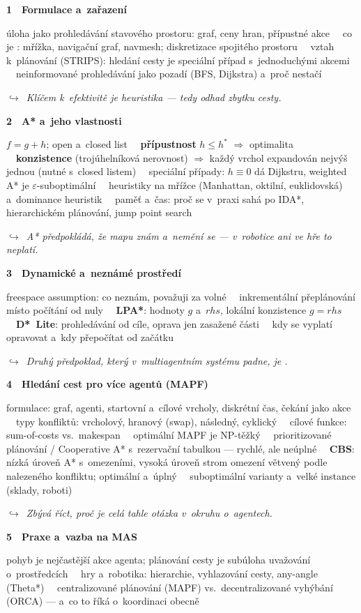 \documentclass[11pt,a4paper]{article}
\newcommand{\tb}{\ \textcolor{defframe}{\textbullet}\ }
\newcommand{\blok}[2]{\par\addvspace{2.4mm}\noindent
  \textcolor{blokcol}{\textbf{#1}}\ \ \textbf{#2}\par\nobreak}
\newcommand{\tema}[1]{\par\nobreak\noindent #1\par}
\newcommand{\most}[1]{\par\nobreak\noindent
  {\small\itshape\textcolor{mostcol}{$\hookrightarrow$\ #1}}\par}
\begin{document}
\blok{1}{Formulace a~zařazení}
\tema{úloha jako prohledávání stavového prostoru: graf, ceny hran, přípustné akce
\tb co je \uv{mapa}: mřížka, navigační graf, navmesh; diskretizace spojitého prostoru
\tb vztah k~plánování (STRIPS): hledání cesty je speciální případ s~jednoduchými akcemi
\tb neinformované prohledávání jako pozadí (BFS, Dijkstra) a~proč nestačí}
\most{Klíčem k~efektivitě je heuristika --- tedy odhad zbytku cesty.}

\blok{2}{A* a~jeho vlastnosti}
\tema{$f = g + h$; open a~closed list
\tb \textbf{přípustnost} $h \le h^*$ $\Rightarrow$ optimalita
\tb \textbf{konzistence} (trojúhelníková nerovnost) $\Rightarrow$ každý vrchol expandován
nejvýš jednou (nutné s~closed listem)
\tb speciální případy: $h\equiv 0$ dá Dijkstru, weighted A* je $\varepsilon$-suboptimální
\tb heuristiky na mřížce (Manhattan, oktilní, euklidovská) a~dominance heuristik
\tb paměť a~čas: proč se v~praxi sahá po IDA*, hierarchickém plánování, jump point search}
\most{A* předpokládá, že mapu znám a~nemění se --- v~robotice ani ve hře to neplatí.}

\blok{3}{Dynamické a~neznámé prostředí}
\tema{freespace assumption: co neznám, považuji za volné
\tb inkrementální přeplánování místo počítání od nuly
\tb \textbf{LPA*}: hodnoty $g$ a~$\mathit{rhs}$, lokální konzistence $g=\mathit{rhs}$
\tb \textbf{D*~Lite}: prohledávání od cíle, oprava jen zasažené části
\tb kdy se vyplatí opravovat a~kdy přepočítat od začátku}
\most{Druhý předpoklad, který v~multiagentním systému padne, je \uv{jsem tu sám}.}

\blok{4}{Hledání cest pro více agentů (MAPF)}
\tema{formulace: graf, agenti, startovní a~cílové vrcholy, diskrétní čas, čekání jako akce
\tb typy konfliktů: vrcholový, hranový (swap), následný, cyklický
\tb cílové funkce: sum-of-costs vs.\ makespan
\tb optimální MAPF je NP-těžký
\tb prioritizované plánování / Cooperative A* s~rezervační tabulkou --- rychlé, ale neúplné
\tb \textbf{CBS}: nízká úroveň A* s~omezeními, vysoká úroveň strom omezení větvený podle
nalezeného konfliktu; optimální a~úplný
\tb suboptimální varianty a~velké instance (sklady, roboti)}
\most{Zbývá říct, proč je celá tahle otázka v~okruhu o~agentech.}

\blok{5}{Praxe a~vazba na MAS}
\tema{pohyb je nejčastější akce agenta; plánování cesty je subúloha uvažování o~prostředcích
\tb hry a~robotika: hierarchie, vyhlazování cesty, any-angle (Theta*)
\tb centralizované plánování (MAPF) vs.\ decentralizované vyhýbání (ORCA) --- a~co to říká
o~koordinaci obecně}
\end{document}
